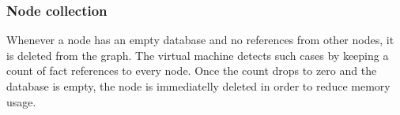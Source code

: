 \subsubsection{Node collection}

Whenever a node has an empty database and no references from other nodes, it is
deleted from the graph. The virtual machine detects such cases by keeping a
count of fact references to every node. Once the count drops to zero and the
database is empty, the node is immediatelly deleted in order to reduce memory
usage.
